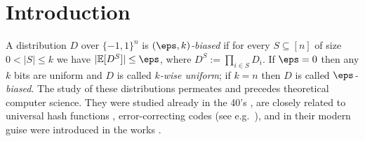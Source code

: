 




























































































\section{Introduction}
A distribution $D$ over $\{-1,1\}^n$ is \emph{$(\eps,k)$-biased} if for every $S \subseteq [n]$ of size $0 < |S| \le k$ we have $|\mathbb{E}[D^S]| \le \eps$, where $D^S := \prod_{i\in S} D_i$.  If $\eps = 0$ then any $k$ bits are uniform and $D$ is called \emph{$k$-wise uniform}; if $k = n$ then $D$ is called \emph{$\eps$-biased}.  The study of these distributions permeates and precedes theoretical computer science.  They were studied already in the 40's \cite{MR22821}, are closely related to universal hash functions \cite{CaW79}, error-correcting codes (see e.g.~\cite{DBLP:journals/eccc/HatamiH23}), and in their modern guise were introduced in the works \cite{ABI86,ChorGoHaFrRuSm85,NaN90}.

